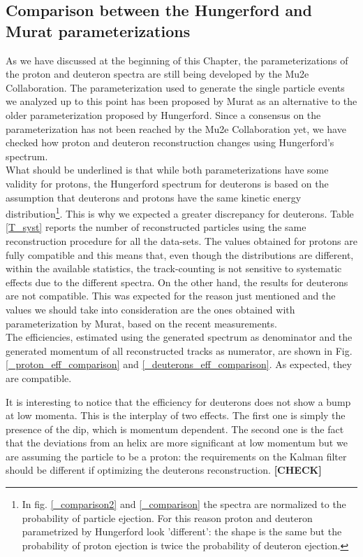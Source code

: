 \documentclass[12pt,a4paper,openright, oneside, titlepage]{book} %
\begin{document}
\subsection{Comparison between the Hungerford and Murat parameterizations}
As we have discussed at the beginning of this Chapter, 
the parameterizations of the proton and deuteron spectra are still being developed
by the Mu2e Collaboration. 
The parameterization used to generate the single particle events 
we analyzed up to this point has been proposed by Murat 
as an alternative to the older parameterization proposed by Hungerford. 
Since a consensus on the parameterization
has not been reached by the Mu2e Collaboration yet, 
we have checked how proton and deuteron reconstruction changes using Hungerford's spectrum.\\
What should be underlined is that while both parameterizations have some validity for protons, 
the Hungerford spectrum for deuterons is based on the assumption that 
deuterons and protons have the same kinetic energy distribution\footnote{In fig. \ref{_comparison2} and \ref{_comparison} the spectra are normalized to the probability of particle ejection. For this reason proton and deuteron parametrized by Hungerford look 'different': the shape is the same but the probability of proton ejection is twice the probability of deuteron ejection.}. 
This is why we expected a greater discrepancy for deuterons. 
Table \ref{T_syst} reports the number of reconstructed particles 
using the same reconstruction procedure for all the data-sets. 
The values obtained for protons are fully compatible and this means that, 
even though the distributions are different, 
within the available statistics, 
the track-counting is not sensitive to systematic effects due 
to the different spectra.
On the other hand, the results for deuterons are not compatible. 
This was expected for the reason just mentioned 
and the values we should take into consideration are the ones
obtained with parameterization by Murat, based on the recent measurements.\\
The efficiencies, estimated using the generated spectrum as denominator
and the generated momentum of all reconstructed tracks as numerator, 
are shown in Fig. \ref{_proton_eff_comparison} and \ref{_deuterons_eff_comparison}. 
As expected, they are compatible.

\noindent It is interesting to notice that the efficiency for deuterons does not show a bump at low momenta. 
This is the interplay of two effects. 
The first one is simply the presence of the dip, which is momentum dependent. 
The second one is the fact that the deviations from an helix are more significant at low momentum 
but we are assuming the particle to be a proton: 
the requirements on the Kalman filter should be different if optimizing the deuterons reconstruction. \textbf{[CHECK]}
\end{document}
